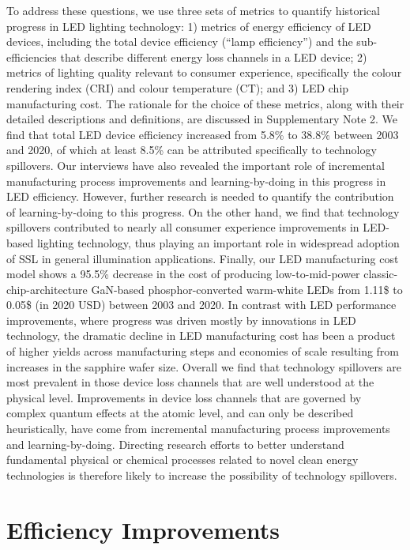\documentclass[parskip=full]{article}
\begin{document}
To address these questions, we use three sets of metrics to quantify historical progress in LED lighting technology: 1) metrics of energy efficiency of LED devices, including the total device efficiency (“lamp efficiency”) and the sub-efficiencies that describe different energy loss channels in a LED device; 2) metrics of lighting quality relevant to consumer experience, specifically the colour rendering index (CRI) and colour temperature (CT); and 3) LED chip manufacturing cost. The rationale for the choice of these metrics, along with their detailed descriptions and definitions, are discussed in Supplementary Note 2. We find that  total LED device efficiency increased from 5.8\% to 38.8\% between 2003 and 2020, of which at least 8.5\% can be attributed specifically to technology spillovers. Our interviews have also revealed the important role of incremental manufacturing process improvements and learning-by-doing \cite{WRIGHT_1936, Arrow_1962} in this progress in LED efficiency. However, further research is needed to quantify the contribution of learning-by-doing to this progress. On the other hand, we find that technology spillovers contributed to nearly all consumer experience improvements in LED-based lighting technology, thus playing an important role in widespread adoption of SSL in general illumination applications. Finally, our LED manufacturing cost model shows a 95.5\% decrease in the cost of producing low-to-mid-power classic-chip-architecture GaN-based phosphor-converted warm-white LEDs from 1.11\$ to 0.05\$ (in 2020 USD) between 2003 and 2020. In contrast with LED performance improvements, where progress was driven mostly by innovations in LED technology, the dramatic decline in LED manufacturing cost has been a product of higher yields across manufacturing steps and economies of scale resulting from increases in the sapphire wafer size. Overall we find that technology spillovers are most prevalent in those device loss channels that are well understood at the physical level. Improvements in device loss channels that are governed by complex quantum effects at the atomic level, and can only be described heuristically, have come from incremental manufacturing process improvements and learning-by-doing. Directing research efforts to better understand fundamental physical or chemical processes related to novel clean energy technologies is therefore likely to increase the possibility of technology spillovers.

\clearpage

\section{Efficiency Improvements}
\end{document}

